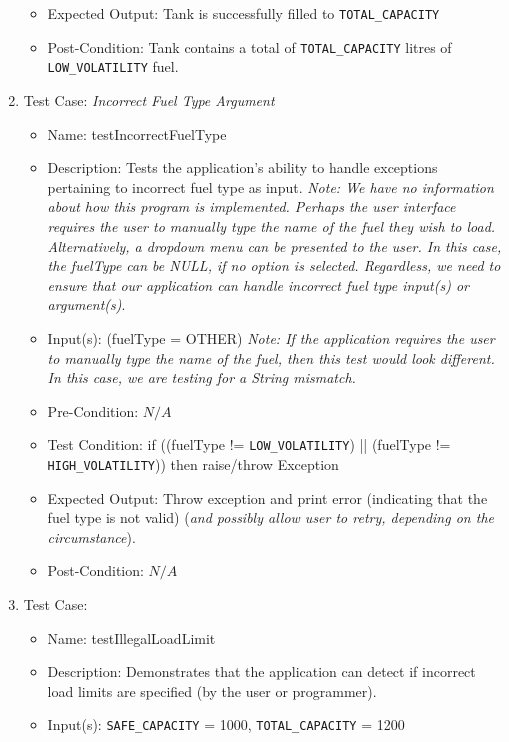 \documentclass{article}
\begin{document}
\begin{enumerate}
\begin{itemize}
            \item Expected Output: Tank is successfully filled to \texttt{TOTAL\_CAPACITY}
            \item Post-Condition: Tank contains a total of \texttt{TOTAL\_CAPACITY} litres of \texttt{LOW\_VOLATILITY} fuel.
        \end{itemize}
    \item Test Case: \textit{Incorrect Fuel Type Argument}
        \begin{itemize}
            \item Name: testIncorrectFuelType
            \item Description: Tests the application's ability to handle exceptions pertaining to incorrect fuel type as input. \textit{Note: We have no information about how this program is implemented. Perhaps the user interface requires the user to manually type the name of the fuel they wish to load. Alternatively, a dropdown menu can be presented to the user. In this case, the fuelType can be NULL, if no option is selected. Regardless, we need to ensure that our application can handle incorrect fuel type input(s) or argument(s)}.
            \item Input(s): (fuelType = OTHER) \textit{Note: If the application requires the user to manually type the name of the fuel, then this test would look different. In this case, we are testing for a String mismatch.}
            \item Pre-Condition: $N/A$
            \item Test Condition: if ((fuelType != \texttt{LOW\_VOLATILITY}) || (fuelType != \texttt{HIGH\_VOLATILITY})) then raise/throw Exception
            \item Expected Output: Throw exception and print error (indicating that the fuel type is not valid) (\textit{and possibly allow user to retry, depending on the circumstance}).
            \item Post-Condition: $N/A$
        \end{itemize}
    \item Test Case: \textit{}
        \begin{itemize}
            \item Name: testIllegalLoadLimit
            \item Description: Demonstrates that the application can detect if incorrect load limits are specified (by the user or programmer).
            \item Input(s): \texttt{SAFE\_CAPACITY} = 1000, \texttt{TOTAL\_CAPACITY} = 1200

\end{itemize}
\end{enumerate}
\end{document}
